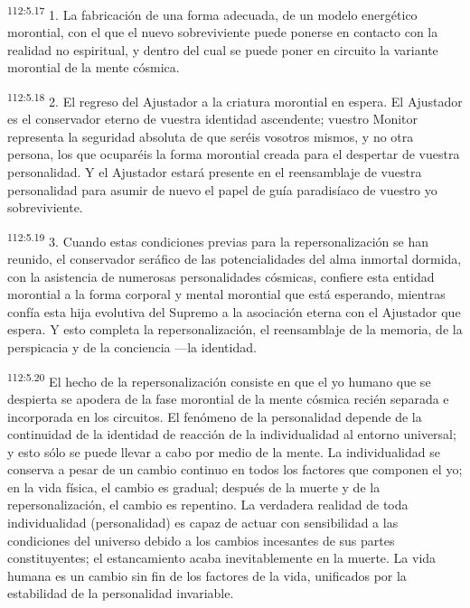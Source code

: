 \documentclass[twoside, 11pt]{book}
\begin{document}
\par
\textsuperscript{112:5.17} 1. La fabricación de una forma adecuada, de un modelo energético morontial, con el que el nuevo sobreviviente puede ponerse en contacto con la realidad no espiritual, y dentro del cual se puede poner en circuito la variante morontial de la mente cósmica.

\par
\textsuperscript{112:5.18} 2. El regreso del Ajustador a la criatura morontial en espera. El Ajustador es el conservador eterno de vuestra identidad ascendente; vuestro Monitor representa la seguridad absoluta de que seréis vosotros mismos, y no otra persona, los que ocuparéis la forma morontial creada para el despertar de vuestra personalidad. Y el Ajustador estará presente en el reensamblaje de vuestra personalidad para asumir de nuevo el papel de guía paradisíaco de vuestro yo sobreviviente.

\par
\textsuperscript{112:5.19} 3. Cuando estas condiciones previas para la repersonalización se han reunido, el conservador seráfico de las potencialidades del alma inmortal dormida, con la asistencia de numerosas personalidades cósmicas, confiere esta entidad morontial a la forma corporal y mental morontial que está esperando, mientras confía esta hija evolutiva del Supremo a la asociación eterna con el Ajustador que espera. Y esto completa la repersonalización, el reensamblaje de la memoria, de la perspicacia y de la conciencia ---la identidad.

\par
\textsuperscript{112:5.20} El hecho de la repersonalización consiste en que el yo humano que se despierta se apodera de la fase morontial de la mente cósmica recién separada e incorporada en los circuitos. El fenómeno de la personalidad depende de la continuidad de la identidad de reacción de la individualidad al entorno universal; y esto sólo se puede llevar a cabo por medio de la mente. La individualidad se conserva a pesar de un cambio continuo en todos los factores que componen el yo; en la vida física, el cambio es gradual; después de la muerte y de la repersonalización, el cambio es repentino. La verdadera realidad de toda individualidad (personalidad) es capaz de actuar con sensibilidad a las condiciones del universo debido a los cambios incesantes de sus partes constituyentes; el estancamiento acaba inevitablemente en la muerte. La vida humana es un cambio sin fin de los factores de la vida, unificados por la estabilidad de la personalidad invariable.
\end{document}
